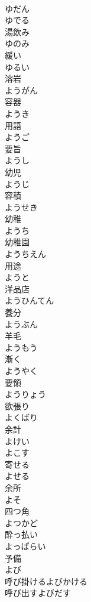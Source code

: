 \documentclass[8pt]{extreport}
\begin{document}
\begin{CJK}{UTF8}{min}
\\	ゆだん	
\\	ゆでる	
\\	湯飲み 
\\	ゆのみ	
\\	緩い 
\\	ゆるい	
\\	溶岩 
\\	ようがん	
\\	容器 
\\	ようき	
\\	用語 
\\	ようご	
\\	要旨 
\\	ようし	
\\	幼児 
\\	ようじ	
\\	容積 
\\	ようせき	
\\	幼稚 
\\	ようち	
\\	幼稚園 
\\	ようちえん	
\\	用途 
\\	ようと	
\\	洋品店 
\\	ようひんてん	
\\	養分 
\\	ようぶん	
\\	羊毛 
\\	ようもう	
\\	漸く 
\\	ようやく	
\\	要領 
\\	ようりょう	
\\	欲張り 
\\	よくばり	
\\	余計 
\\	よけい	
\\	よこす	
\\	寄せる 
\\	よせる	
\\	余所 
\\	よそ	
\\	四つ角 
\\	よつかど	
\\	酔っ払い 
\\	よっぱらい	
\\	予備 
\\	よび	
\\	呼び掛けるよびかける	
\\	呼び出すよびだす	

\end{CJK}
\end{document}
